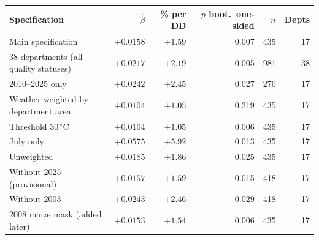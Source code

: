 \begin{tabular}{lrrrrr}
\toprule
Specification & $\hat\beta$ & \% per DD & $p$ boot.\ one-sided & $n$ & Depts \\
\midrule
Main specification & $+0.0158$ & $+1.59$ & 0.007 & 435 & 17 \\
38 departments (all quality statuses) & $+0.0217$ & $+2.19$ & 0.005 & 981 & 38 \\
2010--2025 only & $+0.0242$ & $+2.45$ & 0.027 & 270 & 17 \\
Weather weighted by department area & $+0.0104$ & $+1.05$ & 0.219 & 435 & 17 \\
Threshold 30\,$^{\circ}$C & $+0.0104$ & $+1.05$ & 0.006 & 435 & 17 \\
July only & $+0.0575$ & $+5.92$ & 0.013 & 435 & 17 \\
Unweighted & $+0.0185$ & $+1.86$ & 0.025 & 435 & 17 \\
Without 2025 (provisional) & $+0.0157$ & $+1.59$ & 0.015 & 418 & 17 \\
Without 2003 & $+0.0243$ & $+2.46$ & 0.029 & 418 & 17 \\
2008 maize mask (added later) & $+0.0153$ & $+1.54$ & 0.006 & 435 & 17 \\
\bottomrule
\end{tabular}
